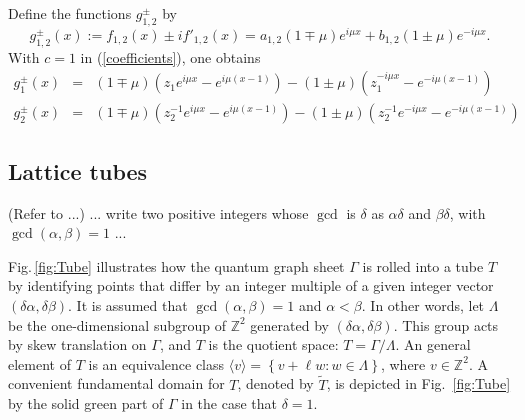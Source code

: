 \documentclass[12pt]{article}
\newcommand{\ZZ}{\mathbb{Z}}
\begin{document}
Define the functions $g^\pm_{1,2}$ by
%
\begin{equation}
  g^\pm_{1,2}(x) := f_{1,2}(x) \pm i f'_{1,2}(x) = a_{1,2} (1\mp\mu) e^{i\mu x} + b_{1,2} (1\pm\mu) e^{-i\mu x}.
\end{equation}
%
With $c=1$ in (\ref{coefficients}), one obtains
%
\begin{eqnarray}
  g_1^\pm(x) &=& (1\mp\mu)\left( z_1e^{i\mu x} - e^{i\mu(x-1)} \right)
                             - (1\pm\mu)\left( z_1^{-i\mu x} - e^{-i\mu(x-1)} \right) \\
  g_2^\pm(x) &=& (1\mp\mu)\left( z_2^{-1}e^{i\mu x} - e^{i\mu(x-1)} \right)
                             - (1\pm\mu)\left( z_2^{-1}e^{-i\mu x} - e^{-i\mu(x-1)} \right)                             
\end{eqnarray}
%



\subsection{Lattice tubes}


(Refer to \cite{KuchmentPost2007} ...) ... write two positive integers whose $\gcd$ is $\delta$ as $\alpha\delta$ and $\beta\delta$, with $\gcd(\alpha,\beta)=1$ ...

Fig.\,\ref{fig:Tube} illustrates how the quantum graph sheet $\Gamma$ is rolled into a tube $T$ by identifying points that differ by an integer multiple of a given integer vector $( \delta\alpha, \delta\beta )$.   It is assumed that $\gcd(\alpha,\beta)=1$ and $\alpha<\beta$.
In other words, let $\Lambda$ be the one-dimensional subgroup of $\ZZ^2$ generated by $( \delta\alpha, \delta\beta )$.  This group acts by skew translation on $\Gamma$, and $T$ is the quotient space: $T=\Gamma/\Lambda$.
An general element of $T$ is an equivalence class $\langle v \rangle = \left\{ v + \ell w : w\in\Lambda \right\}$, where $v\in\ZZ^2$.
A convenient fundamental domain for $T$, denoted by $\tilde T$, is depicted in Fig.~\ref{fig:Tube} by the solid green part of $\Gamma$ in the case that $\delta=1$.
\end{document}
